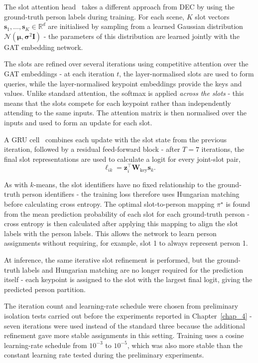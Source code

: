The slot attention head~\cite{locatello2020slotattention} takes a different approach from DEC
by using the ground-truth person labels during training.
For each scene,
$K$ slot vectors $\mathbf{s}_1,\dots,\mathbf{s}_K \in \mathbb{R}^{d}$ are initialised
by sampling from a learned Gaussian distribution
$\mathcal{N}(\boldsymbol{\mu},\boldsymbol{\sigma}^2\mathbf{I})$ -
the parameters of this distribution are learned jointly with the GAT embedding network.

The slots are refined over several iterations
using competitive attention over the GAT embeddings -
at each iteration $t$,
the layer-normalised slots are used to form queries,
while the layer-normalised keypoint embeddings provide the keys and values.
Unlike standard attention,
the softmax is applied \emph{across the slots} -
this means that the slots compete for each keypoint
rather than independently attending to the same inputs.
The attention matrix is then normalised over the inputs and used to form an update for each slot.

A GRU cell~\cite{cho2014gru} combines each update with the slot state from the previous iteration,
followed by a residual feed-forward block -
after $T=7$ iterations,
the final slot representations are used to calculate a logit for every joint-slot pair,
\begin{equation}
    \ell_{ik}
    =
    \mathbf{z}_i^{\top}
    \mathbf{W}_{\text{key}}
    \mathbf{s}_k.
\end{equation}

As with $k$-means,
the slot identifiers have no fixed relationship to the ground-truth person identifiers -
the training loss therefore uses Hungarian matching before calculating cross entropy.
The optimal slot-to-person mapping $\pi^\star$ is found
from the mean prediction probability of each slot for each ground-truth person -
cross entropy is then calculated after applying this mapping
to align the slot labels with the person labels.
This allows the network to learn person assignments
without requiring, for example, slot 1 to always represent person 1.

At inference,
the same iterative slot refinement is performed,
but the ground-truth labels and Hungarian matching are no longer required for the prediction itself -
each keypoint is assigned to the slot with the largest final logit,
giving the predicted person partition.

The iteration count and learning-rate schedule were chosen from preliminary isolation tests
carried out before the experiments reported in Chapter~\ref{chap_4} -
seven iterations were used instead of the standard three
because the additional refinement gave more stable assignments in this setting.
Training uses a cosine learning-rate schedule from $10^{-3}$ to $10^{-5}$,
which was also more stable than the constant learning rate tested during the preliminary experiments.

